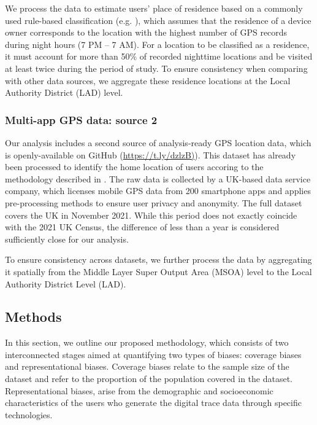 \documentclass[]{rsos}%
\begin{document}
We process the data to estimate users' place of residence based on a
commonly used rule-based classification (e.g. \citep[@zhong24working]{wang2022}), which assumes that the residence of a device owner
corresponds to the location with the highest number of GPS records
during night hours (7 PM -- 7 AM). For a location to be classified as a
residence, it must account for more than 50\% of recorded nighttime
locations and be visited at least twice during the period of study. To
ensure consistency when comparing with other data sources, we aggregate
these residence locations at the Local Authority District (LAD) level.

\subsubsection{Multi-app GPS data: source 2}\label{multi-app-gps-data-source-2}

Our analysis includes a second source of analysis-ready GPS location
data, which is openly-available on GitHub
(\href{https://t.ly/dzlzB}{https://t.ly/dzlzB)}). This dataset has already
been processed to identify the home location of users accoring to the
methodology described in \citep{zhong24working}. The raw data is collected by
a UK-based data service company, which licenses mobile GPS data from 200
smartphone apps and applies pre-processing methods to ensure user
privacy and anonymity. The full dataset covers the UK in November 2021.
While this period does not exactly coincide with the 2021 UK Census, the
difference of less than a year is considered sufficiently close for our
analysis.

To ensure consistency across datasets, we further process the data by
aggregating it spatially from the Middle Layer Super Output Area (MSOA)
level to the Local Authority District Level (LAD).

\subsection{Methods}\label{methods}

In this section, we outline our proposed methodology, which consists of
two interconnected stages aimed at quantifying two types of biases:
coverage biases and representational biases. Coverage biases relate to
the sample size of the dataset and refer to the proportion of the
population covered in the dataset. Representational biases, arise from
the demographic and socioeconomic characteristics of the users who
generate the digital trace data through specific technologies.
\end{document}
